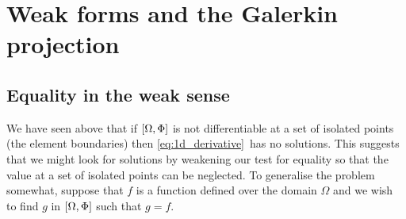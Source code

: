\documentclass[a4paper, 11pt]{book}
\begin{document}
\chapter{Weak forms and the Galerkin projection}

\section{Equality in the weak sense}

We have seen above that if $[\Omega,\Phi]$ is not differentiable at a set of
isolated points (the element boundaries) then \eqref{eq:1d_derivative}\ has
no solutions. This suggests that we might look for solutions by weakening
our test for equality so that the value at a set of isolated points can be
neglected. To generalise the problem somewhat, suppose that  $f$ is a function
defined over the domain $\Omega$ and we wish to find $g$ in $[\Omega,\Phi]$
such that $g=f$.
\end{document}
